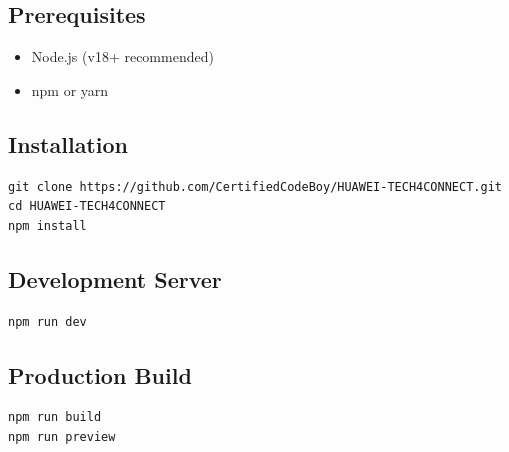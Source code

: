 \documentclass[12pt,a4paper]{article}
\begin{document}
\subsection{Prerequisites}
\begin{itemize}
    \item Node.js (v18+ recommended)
    \item npm or yarn
\end{itemize}

\subsection{Installation}
\begin{verbatim}
git clone https://github.com/CertifiedCodeBoy/HUAWEI-TECH4CONNECT.git
cd HUAWEI-TECH4CONNECT
npm install
\end{verbatim}

\subsection{Development Server}
\begin{verbatim}
npm run dev
\end{verbatim}

\subsection{Production Build}
\begin{verbatim}
npm run build
npm run preview
\end{verbatim}
\end{document}
